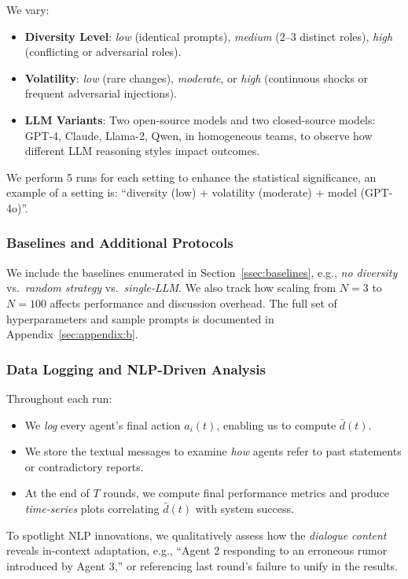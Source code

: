 \vspace{-0.5em}
We vary:
\vspace{-0.5em}
\begin{itemize}[itemsep=1pt, parsep=1pt, leftmargin=*]
    \item \textbf{Diversity Level}: \textit{low} (identical prompts), \textit{medium} (2--3 distinct roles), \textit{high} (conflicting or adversarial roles).
    \item \textbf{Volatility}: \textit{low} (rare changes), \textit{moderate}, or \textit{high} (continuous shocks or frequent adversarial injections).
    \item \textbf{LLM Variants}: Two open-source models and two closed-source models: GPT-4, Claude, Llama-2, Qwen, in homogeneous teams, to observe how different LLM reasoning styles impact outcomes.
\end{itemize}

We perform 5 runs for each setting to enhance the statistical significance, an example of a setting is: ``diversity (low) + volatility (moderate) + model (GPT-4o)''.

\subsubsection{Baselines and Additional Protocols}
We include the baselines enumerated in Section~\ref{ssec:baselines}, e.g., \emph{no diversity} vs.\ \emph{random strategy} vs.\ \emph{single-LLM}. We also track how scaling from $N=3$ to $N=100$ affects performance and discussion overhead. The full set of hyperparameters and sample prompts is documented in Appendix~\ref{sec:appendix:b}.

\subsubsection{Data Logging and NLP-Driven Analysis}
Throughout each run:
\begin{itemize}[itemsep=1pt, parsep=1pt, leftmargin=*]
    \item We \emph{log} every agent’s final action $a_i(t)$, enabling us to compute $\bar{d}(t)$.
    \item We store the textual messages to examine \emph{how} agents refer to past statements or contradictory reports. 
    \item At the end of $T$ rounds, we compute final performance metrics and produce \emph{time-series} plots correlating $\bar{d}(t)$ with system success.
\end{itemize}
To spotlight NLP innovations, we qualitatively assess how the \emph{dialogue content} reveals in-context adaptation, e.g., “Agent 2 responding to an erroneous rumor introduced by Agent 3,” or referencing last round’s failure to unify in the results.

